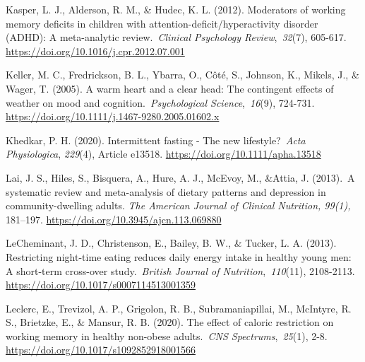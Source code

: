 \documentclass[authordate, empirical]{jote-new-article}
\begin{document}
Kasper, L. J., Alderson, R. M., \& Hudec, K. L. (2012). Moderators of working memory deficits in children with attention-deficit/hyperactivity disorder (ADHD): A meta-analytic review. \emph{Clinical Psychology Review}, \emph{32}(7), 605-617. \url{https://doi.org/10.1016/j.cpr.2012.07.001}



Keller, M. C., Fredrickson, B. L., Ybarra, O., Côté, S., Johnson, K., Mikels, J., \& Wager, T. (2005). A warm heart and a clear head: The contingent effects of weather on mood and cognition. \emph{Psychological Science}, \emph{16}(9), 724-731. \url{https://doi.org/10.1111/j.1467-9280.2005.01602.x}



Khedkar, P. H. (2020). Intermittent fasting - The new lifestyle? \emph{Acta Physiologica}, \emph{229}(4), Article e13518. \url{https://doi.org/10.1111/apha.13518}






Lai, J. S., Hiles, S., Bisquera, A., Hure, A. J., McEvoy, M., \&Attia, J. (2013). A systematic review and meta-analysis of dietary patterns and depression in community-dwelling adults.\emph{ The American Journal of Clinical Nutrition, 99(1), }181--197. \url{https://doi.org/10.3945/ajcn.113.069880}






LeCheminant, J. D., Christenson, E., Bailey, B. W., \& Tucker, L. A. (2013). Restricting night-time eating reduces daily energy intake in healthy young men: A short-term cross-over study. \emph{British Journal of Nutrition}, \emph{110}(11), 2108-2113. \url{https://doi.org/10.1017/s0007114513001359}



Leclerc, E., Trevizol, A. P., Grigolon, R. B., Subramaniapillai, M., McIntyre, R. S., Brietzke, E., \& Mansur, R. B. (2020). The effect of caloric restriction on working memory in healthy non-obese adults. \emph{CNS Spectrums}, \emph{25}(1), 2-8. \url{https://doi.org/10.1017/s1092852918001566}
\end{document}
